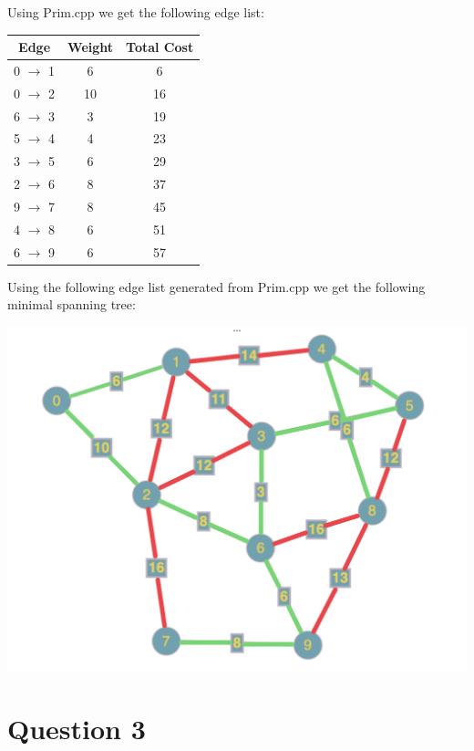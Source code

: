 \documentclass{article}
\begin{document}
\noindent Using Prim.cpp we get the following edge list:

\begin{center}
\begin{tabular}{||c | c | c||} 
\hline
Edge & Weight & Total Cost \\ [0.5ex] 
\hline\hline
0 $\rightarrow$ 1 & 6 & 6 \\ 
\hline
0 $\rightarrow$ 2 & 10 & 16 \\
\hline
6 $\rightarrow$ 3 & 3 & 19 \\
\hline
5 $\rightarrow$ 4 & 4 & 23 \\
\hline
3 $\rightarrow$ 5 & 6 & 29 \\ 
\hline
2 $\rightarrow$ 6 & 8 & 37 \\ 
\hline
9 $\rightarrow$ 7 & 8 & 45 \\
\hline
4 $\rightarrow$ 8 & 6 & 51 \\
\hline
6 $\rightarrow$ 9 & 6 & 57 \\  [1ex] 
\hline
\end{tabular}
\end{center}

\noindent Using the following edge list generated from Prim.cpp we get the following minimal spanning tree:

\begin{center}
\includegraphics[width=\textwidth]{colorizedMST.jpeg}
\end{center}

\section{Question 3}
\end{document}
